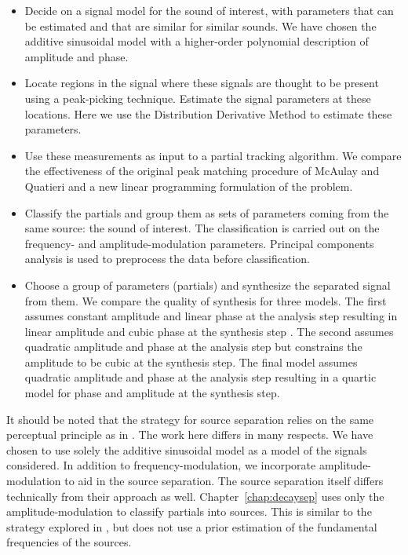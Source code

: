 \begin{itemize}
    \item
        Decide on a signal model for the sound of interest, with parameters that
        can be estimated and that are similar for similar sounds. We have chosen
        the additive sinusoidal model with a higher-order polynomial description
        of amplitude and phase.
    \item
        Locate regions in the signal where these signals are thought to be
        present using a peak-picking technique. Estimate the signal parameters
        at these locations. Here we use the Distribution Derivative Method
        \cite{betser2009sinusoidal} to
        estimate these parameters.
    \item
        Use these measurements as input to a partial tracking algorithm. We
        compare the effectiveness of the original peak matching procedure of
        McAulay and Quatieri \cite{mcaulay1986speech} and a new linear
        programming formulation of the problem.
    \item
        Classify the partials and group them as sets of parameters coming from
        the same source: the sound of interest. The classification is carried
        out on the frequency- and amplitude-modulation parameters. Principal
        components analysis is used to preprocess the data before
        classification.
    \item
        Choose a group of parameters (partials) and synthesize the separated
        signal from them. We compare the quality of synthesis for three models.
        The first assumes constant amplitude and linear phase at the analysis
        step resulting in linear amplitude and cubic phase at the synthesis step
        \cite{mcaulay1986speech}. The second assumes quadratic amplitude and
        phase at the analysis step but constrains the amplitude to be cubic at
        the synthesis step. The final model assumes quadratic amplitude and
        phase at the analysis step resulting in a quartic model for phase and
        amplitude at the synthesis step.
\end{itemize}

It should be noted that the strategy for source separation relies on the same
perceptual principle as in \cite{creager2016musicalsource}. The work here differs in many
respects. We have chosen to use solely the additive sinusoidal model as a
model of the signals considered. In addition to
frequency-modulation, we incorporate amplitude-modulation to aid in the source
separation. The source separation itself differs technically from their
approach as well. Chapter~\ref{chap:decaysep} uses only the amplitude-modulation to
classify partials into sources. This is similar to the strategy explored in
\cite{li2009monaural}, but does not use a prior estimation of the fundamental
frequencies of the sources.

